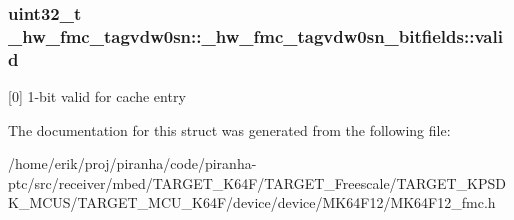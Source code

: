 \subsubsection[{\texorpdfstring{valid}{valid}}]{\setlength{\rightskip}{0pt plus 5cm}uint32\+\_\+t \+\_\+hw\+\_\+fmc\+\_\+tagvdw0sn\+::\+\_\+hw\+\_\+fmc\+\_\+tagvdw0sn\+\_\+bitfields\+::valid}\hypertarget{struct__hw__fmc__tagvdw0sn_1_1__hw__fmc__tagvdw0sn__bitfields_a4d75b764dacea45017ed95b28177365e}{}\label{struct__hw__fmc__tagvdw0sn_1_1__hw__fmc__tagvdw0sn__bitfields_a4d75b764dacea45017ed95b28177365e}
\mbox{[}0\mbox{]} 1-\/bit valid for cache entry 

The documentation for this struct was generated from the following file\+:\begin{DoxyCompactItemize}
\item 
/home/erik/proj/piranha/code/piranha-\/ptc/src/receiver/mbed/\+T\+A\+R\+G\+E\+T\+\_\+\+K64\+F/\+T\+A\+R\+G\+E\+T\+\_\+\+Freescale/\+T\+A\+R\+G\+E\+T\+\_\+\+K\+P\+S\+D\+K\+\_\+\+M\+C\+U\+S/\+T\+A\+R\+G\+E\+T\+\_\+\+M\+C\+U\+\_\+\+K64\+F/device/device/\+M\+K64\+F12/M\+K64\+F12\+\_\+fmc.\+h\end{DoxyCompactItemize}
